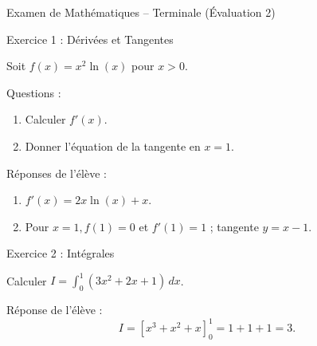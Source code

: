 \documentclass{article}
\begin{document}
Examen de Mathématiques – Terminale (Évaluation 2)

Exercice 1 : Dérivées et Tangentes

Soit \( f(x) = x^2 \ln(x) \) pour \( x > 0 \).

Questions :
\begin{enumerate}
    \item Calculer \( f'(x) \).
    \item Donner l’équation de la tangente en \( x = 1 \).
\end{enumerate}

Réponses de l’élève :
\begin{enumerate}
    \item \( f'(x) = 2x \ln(x) + x \).
    \item Pour \( x = 1, f(1) = 0 \) et \( f'(1) = 1 \) ; tangente \( y = x - 1 \).
\end{enumerate}

Exercice 2 : Intégrales

Calculer \( I = \int_{0}^{1} (3x^2 + 2x + 1) \, dx \).

Réponse de l’élève :
\[
I = \left[ x^3 + x^2 + x \right]_{0}^{1} = 1 + 1 + 1 = 3.
\]
\end{document}
